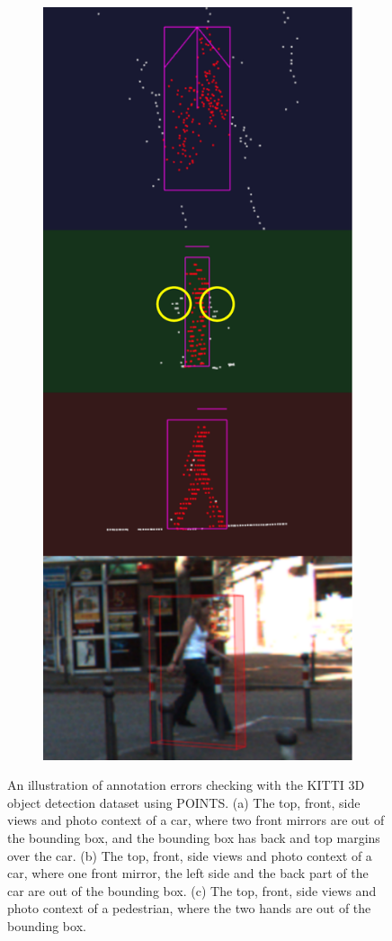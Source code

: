\documentclass[letterpaper, 10 pt, conference]{ieeeconf}  %
\begin{document}
\begin{figure}
\begin{subfigure}{0.3\linewidth}
		\includegraphics[scale=0.2]{./figures/annocheck-2}
		\caption{}
	\end{subfigure}
	
	\caption{
	An illustration of annotation errors checking with the KITTI 3D object detection dataset using POINTS. 
	(a) The top, front, side views and photo context of a car, 
	where two front mirrors are out of the bounding box, and the bounding box has back and top margins over the car. 
	(b) The top, front, side views and photo context of a car,
	where one front mirror, the left side and the back part of the car are out of the bounding box.
	(c) The top, front, side views and photo context of a pedestrian,     
	where the two hands are out of the bounding box.}
	\label{fig:annocheck}
\end{figure}
\end{document}
